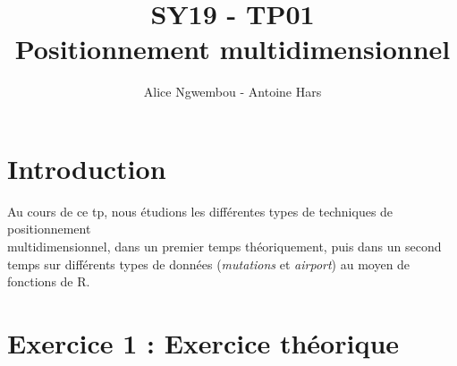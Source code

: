 \documentclass[a4paper, 10pt]{article}
\title{SY19 - TP01\\Positionnement multidimensionnel}
\author{Alice Ngwembou - Antoine Hars}
\begin{document}
\maketitle

\section*{Introduction}
Au cours de ce tp, nous étudions les différentes types de techniques de positionnement\\multidimensionnel, dans un premier temps théoriquement,
puis dans un second temps sur différents types de données (\textit{mutations} et \textit{airport}) au moyen de fonctions de R.

\section*{Exercice 1 : Exercice théorique}
\end{document}
